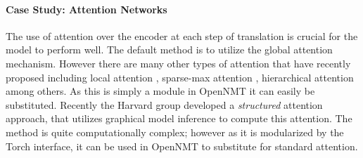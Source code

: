 \documentclass[11pt]{article}
\begin{document}
\paragraph{Case Study: Attention Networks}

The use of attention over the encoder at each step of translation is
crucial for the model to perform well. The default method is to
utilize the global attention mechanism. However
there are many other types of attention that have recently proposed
including local attention \cite{Luong2015}, sparse-max attention
\cite{martins2016softmax}, hierarchical attention
\cite{yang2016hierarchical} among others. As this is simply a module
in OpenNMT it can easily be substituted. Recently the Harvard
group developed a \textit{structured} attention approach,
that utilizes graphical model inference to compute this attention. The
method is quite computationally complex; however as it is modularized by the Torch
interface, it can be used in OpenNMT to substitute
for standard attention.



\end{document}
